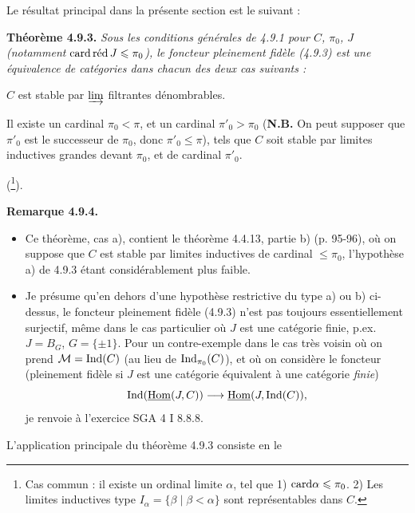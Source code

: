 
Le résultat principal dans la présente section est le suivant :

\textbf{Théorème 4.9.3.} \textit{Sous les conditions générales de 4.9.1 pour $C$, $\pi_0$, $J$ (notamment} $\cardred J \leqslant \pi_0$\textit{), le foncteur pleinement fidèle (4.9.3) est une équivalence de catégories dans chacun des deux cas suivants :}
\begin{itemize}[label={}]
{\itshape
\item[a)] $C$ est stable par $\varinjlim$ filtrantes dénombrables.
\item[b)] Il existe un cardinal $\pi_0 < \pi$, et un cardinal $\pi'_0 > \pi_0$ \textup{(}\textbf{\upshape N.B.} On peut supposer que $\pi'_0$ est le successeur de $\pi_0$, donc $\pi'_0 \leqslant \pi$), tels que $C$ soit stable par limites inductives grandes devant $\pi_0$, et de cardinal $\pi'_0$.
}
\end{itemize}
(\footnote[94]{Cas commun : il existe un ordinal limite $\alpha$, tel que 1) $\card \alpha \leqslant \pi_0$. 2) Les limites inductives type $I_\alpha = \{\beta \mid \beta < \alpha\}$ sont représentables dans $C$.}).

\textbf{Remarque 4.9.4.}
\begin{itemize}[label={}]
\item[a)] Ce théorème, cas a), contient le théorème 4.4.13, partie b) (p. 95-96), où on suppose que $C$ est stable par limites inductives de cardinal $\leqslant \pi_0$, l'hypothèse a) de 4.9.3 étant considérablement plus faible.
\item[b)] Je présume qu'en dehors d'une hypothèse restrictive du type a) ou b) ci-dessus, le foncteur pleinement fidèle (4.9.3) n'est pas toujours essentiellement surjectif, même dans le cas particulier où $J$ est une catégorie finie, p.ex. $J = B_G$, $G = \{\pm 1\}$. Pour un contre-exemple dans le cas très voisin où on prend $\cM = \Ind(C)$ (au lieu de $\Ind_{\pi_0}(C)$), et où on considère le foncteur (pleinement fidèle si $J$ est une catégorie équivalent à une catégorie \textit{finie}) %
\[
\Ind(\uHom(J,C)) \longrightarrow \uHom(J,\Ind(C)),
\]
je renvoie à l'exercice SGA 4 I 8.8.8.
\end{itemize}
L'application principale du théorème 4.9.3 consiste en le

